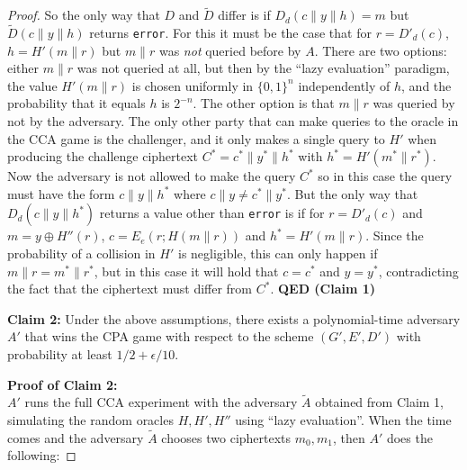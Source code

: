\begin{proof}
So the only way that \(D\) and \(\tilde{D}\) differ is if
\(D_d(c\|y\|h)=m\) but \(\tilde{D}(c\|y\|h)\) returns \texttt{error}.
For this it must be the case that for \(r=D'_d(c)\), \(h=H'(m\|r)\) but
\(m\|r\) was \emph{not} queried before by \(A\). There are two options:
either \(m\|r\) was not queried at all, but then by the ``lazy
evaluation'' paradigm, the value \(H'(m\|r)\) is chosen uniformly in
\(\{0,1\}^n\) independently of \(h\), and the probability that it equals
\(h\) is \(2^{-n}\). The other option is that \(m\|r\) was queried by
not by the adversary. The only other party that can make queries to the
oracle in the CCA game is the challenger, and it only makes a single
query to \(H'\) when producing the challenge ciphertext
\(C^* = c^*\|y^*\|h^*\) with \(h^* = H'(m^*\|r^*)\). Now the adversary
is not allowed to make the query \(C^*\) so in this case the query must
have the form \(c\|y\|h^*\) where \(c\|y \neq c^*\|y^*\). But the only
way that \(D_d(c\|y\|h^*)\) returns a value other than \texttt{error} is
if for \(r=D'_d(c)\) and \(m = y \oplus H''(r)\), \(c=E_e(r;H(m\|r))\)
and \(h^* = H'(m\|r)\). Since the probability of a collision in \(H'\)
is negligible, this can only happen if \(m\|r = m^*\|r^*\), but in this
case it will hold that \(c=c^*\) and \(y=y^*\), contradicting the fact
that the ciphertext must differ from \(C^*\). \textbf{QED (Claim 1)}

\textbf{Claim 2:} Under the above assumptions, there exists a
polynomial-time adversary \(A'\) that wins the CPA game with respect to
the scheme \((G',E',D')\) with probability at least
\(1/2 + \epsilon/10\).

\textbf{Proof of Claim 2:}\\
\(A'\) runs the full CCA experiment with the adversary \(\tilde{A}\)
obtained from Claim 1, simulating the random oracles \(H,H',H''\) using
``lazy evaluation''. When the time comes and the adversary \(\tilde{A}\)
chooses two ciphertexts \(m_0,m_1\), then \(A'\) does the following:


\end{proof}
